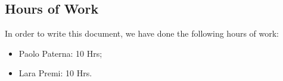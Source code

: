 \documentclass[12pt,a4paper]{article}
\begin{document}
	
	\tableofcontents
	\newpage
	
	
	
	
	\subsection{Hours of Work}
	In order to write this document, we have done the following hours of work:
	\begin{itemize}
	\item Paolo Paterna: 10 Hrs;
	\item Lara Premi: 10 Hrs.
	\end{itemize}
	\newpage
\end{document}
